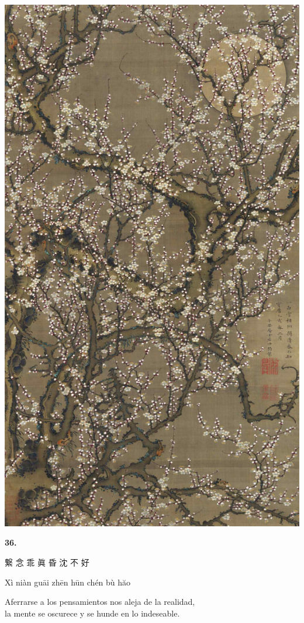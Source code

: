 \documentclass[
  a5paperpaper,
]{article}
\begin{document}
\hypertarget{01}{}
\includegraphics{../img/image08.jpg}

\begin{verseblock}

\newpage

\begin{center}\textbf{36.}\end{center}

繋 念 乖 眞 昏 沈 不 好

Xì niàn guāi zhēn hūn chén bù hăo

Aferrarse a los pensamientos nos aleja de la realidad,\\
la mente se oscurece y se hunde en lo indeseable.

\end{verseblock}
\end{document}
